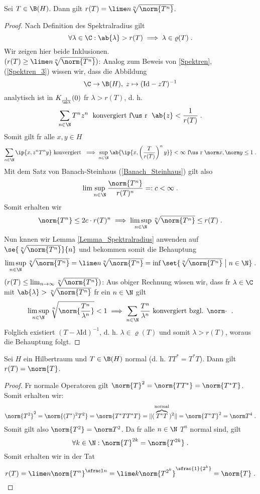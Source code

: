 	\begin{theorem}
		Sei \(T\in\B(H)\). Dann gilt \(r(T) = \lime n \sqrt[n]{\norm{T^n}}\).
	\end{theorem}
	\begin{proof}
		\happybegin
		Nach Definition des Spektralradius gilt 
		\[\forall \lambda \in \C: \ab{\lambda} > r(T) \implies \lambda \in \varrho(T)\;.\]
		Wir zeigen hier beide Inklusionen.\\
		\((r(T) \geq \lime n \sqrt[n]{\norm{T^n}})\): Analog zum Beweis von \ref{Spektren}, (\ref{Spektren_3}) wissen wir, dass die Abbildung 
		\[\C \to \B(H),\; z \mapsto (\text{Id} - z T)^{-1}\]
		analytisch ist in \(K_{\frac{1}{\ab\lambda}}(0)\) f\us r \(\lambda > r(T)\), d. h. 
		\[\sum_{n\in\N} T^n z^n \;\text{ konvergiert f\us r }\; \ab{z} < \frac{1}{r(T)}\;.\]
		Somit gilt f\us r alle \(x,y \in H\) 
		\[\sum_{n\in\N} \ip{x, z^n T^ny} \text{ konvergiert }\implies  \sup_{n\in\N}\ab{\ip{x, \left(\frac{T}{r(T)}\right)^n y}} < \infty \text{ f\us r } \norm x, \norm y \leq 1\;.\]
		Mit dem Satz von Banach-Steinhaus (\ref{Banach_Steinhaus}) gilt also \[\lim\sup_{n\in\N}\frac{\norm{T^n}}{r(T)^n} =: c < \infty\;.\]
		Somit erhalten wir
		\[\norm{T^n} \leq 2c \cdot r(T)^n \implies \limsup_{n\in\N}\sqrt[n]{\norm{T^n}} \leq r(T)\;.\]
			Nun k\os nnen wir Lemma \ref{Lemma_Spektralradius} anwenden auf \(\se{ \sqrt[n]{\norm{T^n}}}{n}\) und bekommen somit die Behauptung
		\[\limsup_{n\in\N}\sqrt[n]{\norm{T^n}} = \lime n \sqrt[n]{\norm{T^n}} = \inf\set{\sqrt[n]{\norm{T^n}}\;\big\vert\; n\in \N}\;.\]
		\((r(T) \leq \lim_{n\to\infty} \sqrt[n]{\norm{T^n}})\): Aus obiger Rechnung wissen wir, dass f\us r \(\lambda \in \C\) mit \(\ab{\lambda} > \sqrt[n]{\norm{T^n}}\) f\us r ein \(n\in\N\) gilt
		\[\limsup_{n\in\N} \sqrt[n]{\norm{\frac{T^n}{\lambda^n}}} < 1\implies \sum_{n\in\N} \frac{T^n}{\lambda^n}\text{ konvergiert bzgl. $\norm\cdot$ }\;.\]
		Folglich existiert \((T-\lambda\text{Id})^{-1}\), d. h. \(\lambda \in \varrho(T)\) und somit \(\lambda > r(T)\), woraus die Behauptung folgt.\happyend
	\end{proof}
	
	
	\begin{theorem}
		Sei $H$ ein Hilbertraum und \(T \in \B(H)\) normal (d. h. \(TT^* = T^*T\)). Dann gilt \(r(T) = \norm{T}\).
	\end{theorem}
	\begin{proof}
		F\us r normale Operatoren gilt \(\norm{T}^2 = \norm{TT^*} = \norm{T^*T}\). Somit erhalten wir:
		\[\norm{T^2}^2 = \norm{(T^*)^2 T^2} = \norm{T^*TT^*T} = \lVert(\overbrace{T^*T}^{\text{normal}})^2\rVert = \norm{T^*T}^2 = \norm T^4\;.\]
		Somit gilt also \(\norm{T^2} = \norm T^2\). Da f\us r alle \(n\in\N\) $T^n$ normal sind, gilt  
		\[\forall k\in\N: \norm{T}^{2k} = \norm{T^{2k}}\;.\]
		Somit erhalten wir in der Tat 
		\[r(T) = \lime n \norm{T^n}^{\sfrac 1n} = \lime k \norm{T^{2^k}}^{\sfrac{1}{2^k}} = \norm{T}\;. \]
		
	\end{proof}